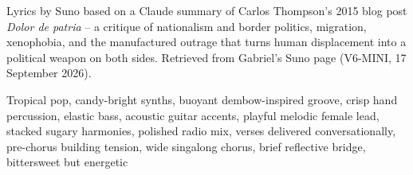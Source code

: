 
\begin{notes}
Lyrics by Suno based on a Claude summary of Carlos Thompson's 2015 blog post \emph{Dolor de patria} -- a critique of nationalism and border politics, migration, xenophobia, and the manufactured outrage that turns human displacement into a political weapon on both sides. Retrieved from Gabriel's Suno page (V6-MINI, 17 September 2026).
\end{notes}
\begin{style}
Tropical pop, candy-bright synths, buoyant dembow-inspired groove, crisp hand percussion, elastic bass, acoustic guitar accents, playful melodic female lead, stacked sugary harmonies, polished radio mix, verses delivered conversationally, pre-chorus building tension, wide singalong chorus, brief reflective bridge, bittersweet but energetic
\end{style}
